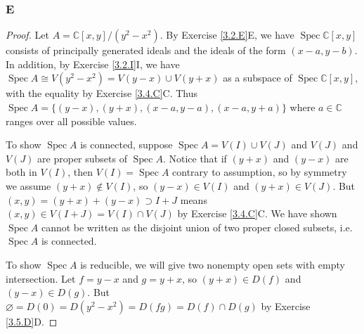 \documentclass{article}
\newcommand{\C}{\mathbb{C}}
\DeclareMathOperator{\Spec}{\mathrm{Spec}}
\let\emptyset\varnothing
\theoremstyle{definition} %
\begin{document}
\subsubsection{E}\label{3.6.E}
\begin{proof}
    Let $A=\C[x,y]/(y^2-x^2)$. By Exercise \ref{3.2.E}E, we have $\Spec \C[x,y]$ consists of principally generated ideals and the ideals of the form $(x-a,y-b)$. In addition, by Exercise \ref{3.2.I}I, we have $\Spec A \cong V(y^2-x^2)=V(y-x)\cup V(y+x)$ as a subspace of $\Spec \C[x,y]$, with the equality by Exercise \ref{3.4.C}C. Thus $\Spec A = \{(y-x),(y+x), (x-a,y-a), (x-a, y+a)\}$ where $a\in \C$ ranges over all possible values.
    
    To show $\Spec A$ is connected, suppose $\Spec A = V(I)\cup V(J)$ and $V(J)$ and $V(J)$ are proper subsets of $\Spec A$. Notice that if $(y+x)$ and $(y-x)$ are both in $V(I)$, then $V(I)=\Spec A$ contrary to assumption, so by symmetry we assume $(y+x)\notin V(I)$, so $(y-x)\in V(I)$ and $(y+x)\in V(J)$. But $(x,y)= (y+x) + (y-x)\supset I+J$ means $(x,y)\in V(I+J) = V(I)\cap V(J)$ by Exercise \ref{3.4.C}C. We have shown $\Spec A$ cannot be written as the disjoint union of two proper closed subsets, i.e. $\Spec A$ is connected.

    To show $\Spec A$ is reducible, we will give two nonempty open sets with empty intersection. Let $f=y-x$ and $g=y+x$, so $(y+x)\in D(f)$ and $(y-x)\in D(g)$. But $\emptyset = D(0)=D(y^2-x^2)=D(fg)=D(f)\cap D(g)$ by Exercise \ref{3.5.D}D.
\end{proof}
\end{document}
